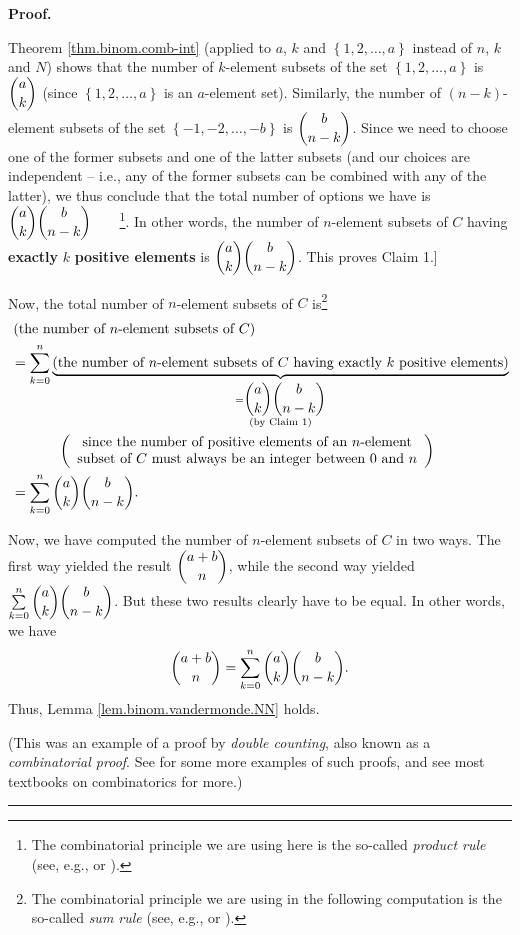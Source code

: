 \documentclass[numbers=enddot,12pt,final,onecolumn,notitlepage]{scrartcl}%
\numberwithin{exer}{subsection}
\theoremstyle{definition}
\newenvironment{proof}[1][Proof]{\noindent\textbf{#1.} }{\ \rule{0.5em}{0.5em}}
\let\sumnonlimits\sum
\renewcommand{\sum}{\sumnonlimits\limits}
\begin{document}
\begin{proof}
\begin{itemize}
Theorem \ref{thm.binom.comb-int} (applied to $a$, $k$ and $\left\{
1,2,\ldots,a\right\}  $ instead of $n$, $k$ and $N$) shows that the number of
$k$-element subsets of the set $\left\{  1,2,\ldots,a\right\}  $ is
$\dbinom{a}{k}$ (since $\left\{  1,2,\ldots,a\right\}  $ is an $a$-element
set). Similarly, the number of $\left(  n-k\right)  $-element subsets of the
set $\left\{  -1,-2,\ldots,-b\right\}  $ is $\dbinom{b}{n-k}$. Since we need
to choose one of the former subsets and one of the latter subsets (and our
choices are independent -- i.e., any of the former subsets can be combined
with any of the latter), we thus conclude that the total number of options we
have is $\dbinom{a}{k}\dbinom{b}{n-k}$\ \ \ \ \footnote{The combinatorial
principle we are using here is the so-called \textit{product rule} (see, e.g.,
\cite[1.8]{Loehr-BC} or \cite[\S 15.2.1]{LeLeMe}).}. In other words, the
number of $n$-element subsets of $C$ having \textbf{exactly }$k$
\textbf{positive elements} is $\dbinom{a}{k}\dbinom{b}{n-k}$. This proves
Claim 1.]

Now, the total number of $n$-element subsets of $C$ is\footnote{The
combinatorial principle we are using in the following computation is the
so-called \textit{sum rule} (see, e.g., \cite[1.2]{Loehr-BC} or
\cite[\S 15.2.3]{LeLeMe}).}%
\begin{align*}
&  \left(  \text{the number of }n\text{-element subsets of }C\right) \\
&  =\sum_{k=0}^{n}\underbrace{\left(  \text{the number of }n\text{-element
subsets of }C\text{ having exactly }k\text{ positive elements}\right)
}_{\substack{=\dbinom{a}{k}\dbinom{b}{n-k}\\\text{(by Claim 1)}}}\\
&  \ \ \ \ \ \ \ \ \ \ \left(
\begin{array}
[c]{c}%
\text{since the number of positive elements of an }n\text{-element}\\
\text{subset of }C\text{ must always be an integer between }0\text{ and }n
\end{array}
\right) \\
&  =\sum_{k=0}^{n}\dbinom{a}{k}\dbinom{b}{n-k}.
\end{align*}

\end{itemize}

Now, we have computed the number of $n$-element subsets of $C$ in two ways.
The first way yielded the result $\dbinom{a+b}{n}$, while the second way
yielded $\sum_{k=0}^{n}\dbinom{a}{k}\dbinom{b}{n-k}$. But these two results
clearly have to be equal. In other words, we have%
\[
\dbinom{a+b}{n}=\sum_{k=0}^{n}\dbinom{a}{k}\dbinom{b}{n-k}.
\]
Thus, Lemma \ref{lem.binom.vandermonde.NN} holds.

(This was an example of a proof by \textit{double counting}, also known as a
\textit{combinatorial proof}. See \cite[\S 15.10]{LeLeMe} for some more
examples of such proofs, and see most textbooks on combinatorics for more.)
\end{proof}
\end{document}
